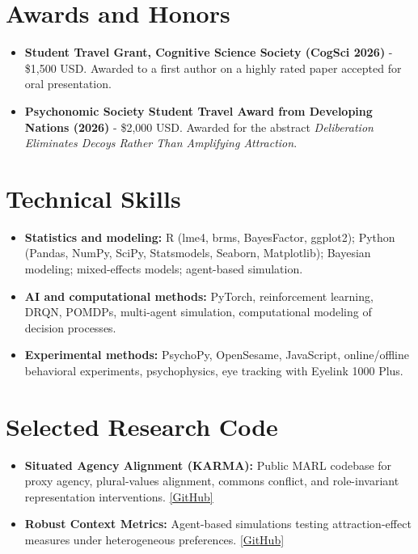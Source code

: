 \documentclass[10pt, a4paper]{extarticle}
\newcommand{\sectiontight}[1]{\vspace{6pt}\section{#1}}
\begin{document}
\sectiontight{Awards and Honors}
\begin{itemize}
  \item \textbf{Student Travel Grant, Cognitive Science Society (CogSci 2026)} - \$1,500 USD. Awarded to a first author on a highly rated paper accepted for oral presentation.
  \item \textbf{Psychonomic Society Student Travel Award from Developing Nations (2026)} - \$2,000 USD. Awarded for the abstract \textit{Deliberation Eliminates Decoys Rather Than Amplifying Attraction}.
\end{itemize}

\sectiontight{Technical Skills}
\begin{itemize}
  \item \textbf{Statistics and modeling:} R (lme4, brms, BayesFactor, ggplot2); Python (Pandas, NumPy, SciPy, Statsmodels, Seaborn, Matplotlib); Bayesian modeling; mixed-effects models; agent-based simulation.
  \item \textbf{AI and computational methods:} PyTorch, reinforcement learning, DRQN, POMDPs, multi-agent simulation, computational modeling of decision processes.
  \item \textbf{Experimental methods:} PsychoPy, OpenSesame, JavaScript, online/offline behavioral experiments, psychophysics, eye tracking with Eyelink 1000 Plus.
\end{itemize}

\sectiontight{Selected Research Code}
\begin{itemize}
  \item \textbf{Situated Agency Alignment (KARMA):} Public MARL codebase for proxy agency, plural-values alignment, commons conflict, and role-invariant representation interventions. \href{https://github.com/tapasiitk/situated-agency-alignment}{[GitHub]}
  \item \textbf{Robust Context Metrics:} Agent-based simulations testing attraction-effect measures under heterogeneous preferences. \href{https://github.com/tapasiitk/robust-context-metrics}{[GitHub]}
\end{itemize}
\end{document}
